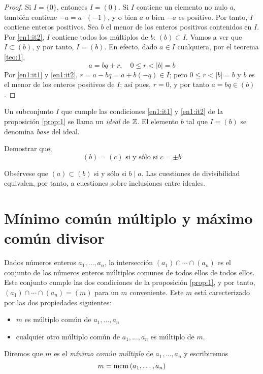 \begin{proof}
    Si $I=\{0\}$, entonces $I=(0)$. Si $I$ contiene un elemento no nulo $a$, también contiene $-a=a\cdot(-1)$, y o bien $a$ o bien $-a$ es positivo. Por tanto, $I$ contiene enteros positivos. Sea $b$ el menor de los enteros positivos contenidos en $I$. Por \ref{en1:it2}, $I$ contiene todos los múltiplos de $b$: $(b)\subset I$. Vamos a ver que $I\subset (b)$, y por tanto, $I=(b)$. En efecto, dado $a\in I$ cualquiera, por el teorema \ref{teo:1},
    $$a=bq+r, \quad 0\leq r<|b|=b$$
    Por \ref{en1:it1} y \ref{en1:it2}, $r=a-bq=a+b(-q)\in I$; pero $0\leq r<|b|=b$ y $b$ es el menor de los enteros positivos de $I$; así pues, $r=0$, y por tanto $a=bq\in (b)$.
\end{proof}

Un subconjunto $I$ que cumple las condiciones \ref{en1:it1} y \ref{en1:it2} de la proposición \ref{prop:1} se llama un {\it ideal} de $\mathbb{Z}$. El elemento $b$ tal que $I=(b)$ se denomina {\it base} del ideal.

\begin{ejer}
    Demostrar que,
    $$(b)=(c)\text{ si y sólo si }c=\pm b$$
\end{ejer}

Obsérvese que $(a)\subset (b)$ si y sólo si $b\mid a$. Las cuestiones de divisibilidad equivalen, por tanto, a cuestiones sobre inclusiones entre ideales.

\section{Mínimo común múltiplo y máximo común divisor}

Dados números enteros $a_1,\dots,a_n$, la intersección $(a_1)\cap\cdots\cap(a_n)$ es el conjunto de los números enteros múltiplos comunes de todos ellos de todos ellos. Este conjunto cumple las dos condiciones de la proposición \ref{prop:1}, y por tanto, $(a_1)\cap\cdots\cap(a_n)=(m)$ para un $m$ conveniente. Este $m$ está carecterizado por las dos propiedades siguientes:

\begin{itemize}
    \item $m$ es múltiplo común de $a_1,\dots,a_n$
    \item cualquier otro múltiplo común de $a_1,\dots,a_n$ es múltiplo de $m$.
\end{itemize}

Diremos que $m$ es el {\it mínimo común múltiplo} de $a_1,\dots,a_n$ y escribiremos
$$m=\operatorname{\rm mcm}\left(a_1,\dots,a_n\right)$$

